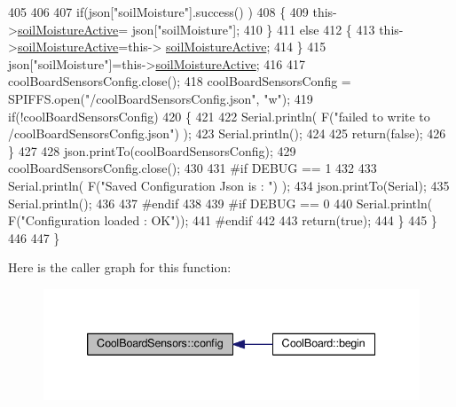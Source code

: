 \begin{DoxyCode}
405 
406             
407             \textcolor{keywordflow}{if}(json[\textcolor{stringliteral}{"soilMoisture"}].success() )
408             \{           
409                 this->\hyperlink{class_cool_board_sensors_ae7971bf527781ac4994309591b78ab89}{soilMoistureActive}= json[\textcolor{stringliteral}{"soilMoisture"}];
410             \}
411             \textcolor{keywordflow}{else}
412             \{
413                 this->\hyperlink{class_cool_board_sensors_ae7971bf527781ac4994309591b78ab89}{soilMoistureActive}=this->
      \hyperlink{class_cool_board_sensors_ae7971bf527781ac4994309591b78ab89}{soilMoistureActive};
414             \}
415             json[\textcolor{stringliteral}{"soilMoisture"}]=this->\hyperlink{class_cool_board_sensors_ae7971bf527781ac4994309591b78ab89}{soilMoistureActive};
416 
417             coolBoardSensorsConfig.close();         
418             coolBoardSensorsConfig = SPIFFS.open(\textcolor{stringliteral}{"/coolBoardSensorsConfig.json"}, \textcolor{stringliteral}{"w"});          
419             \textcolor{keywordflow}{if}(!coolBoardSensorsConfig)
420             \{
421 
422                 Serial.println( F(\textcolor{stringliteral}{"failed to write to /coolBoardSensorsConfig.json"}) );
423                 Serial.println();
424 
425                 \textcolor{keywordflow}{return}(\textcolor{keyword}{false});          
426             \}  
427 
428             json.printTo(coolBoardSensorsConfig);
429             coolBoardSensorsConfig.close();         
430             
431 \textcolor{preprocessor}{        #if DEBUG == 1}
432 
433             Serial.println( F(\textcolor{stringliteral}{"Saved Configuration Json is : "}) );
434             json.printTo(Serial);
435             Serial.println();
436         
437 \textcolor{preprocessor}{        #endif}
438 
439 \textcolor{preprocessor}{        #if DEBUG == 0}
440             Serial.println( F(\textcolor{stringliteral}{"Configuration loaded : OK"}));
441 \textcolor{preprocessor}{        #endif}
442 
443             \textcolor{keywordflow}{return}(\textcolor{keyword}{true}); 
444         \}
445     \}   
446 
447 \}
\end{DoxyCode}
Here is the caller graph for this function\+:\nopagebreak
\begin{figure}[H]
\begin{center}
\leavevmode
\includegraphics[width=339pt]{de/d46/class_cool_board_sensors_a9a218895c5423375c33c08f2c56fb23a_icgraph}
\end{center}
\end{figure}
\mbox{\label{class_cool_board_sensors_a4902b69f6e628bd6557193758fdd2bae}} 
